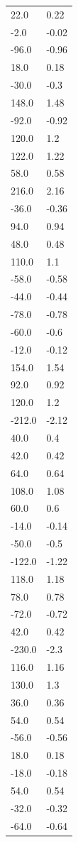 \begin{longtable}{ll}
22.0 & 0.22 \\
-2.0 & -0.02 \\
-96.0 & -0.96 \\
18.0 & 0.18 \\
-30.0 & -0.3 \\
148.0 & 1.48 \\
-92.0 & -0.92 \\
120.0 & 1.2 \\
122.0 & 1.22 \\
58.0 & 0.58 \\
216.0 & 2.16 \\
-36.0 & -0.36 \\
94.0 & 0.94 \\
48.0 & 0.48 \\
110.0 & 1.1 \\
-58.0 & -0.58 \\
-44.0 & -0.44 \\
-78.0 & -0.78 \\
-60.0 & -0.6 \\
-12.0 & -0.12 \\
154.0 & 1.54 \\
92.0 & 0.92 \\
120.0 & 1.2 \\
-212.0 & -2.12 \\
40.0 & 0.4 \\
42.0 & 0.42 \\
64.0 & 0.64 \\
108.0 & 1.08 \\
60.0 & 0.6 \\
-14.0 & -0.14 \\
-50.0 & -0.5 \\
-122.0 & -1.22 \\
118.0 & 1.18 \\
78.0 & 0.78 \\
-72.0 & -0.72 \\
42.0 & 0.42 \\
-230.0 & -2.3 \\
116.0 & 1.16 \\
130.0 & 1.3 \\
36.0 & 0.36 \\
54.0 & 0.54 \\
-56.0 & -0.56 \\
18.0 & 0.18 \\
-18.0 & -0.18 \\
54.0 & 0.54 \\
-32.0 & -0.32 \\
-64.0 & -0.64 \\

\end{longtable}
